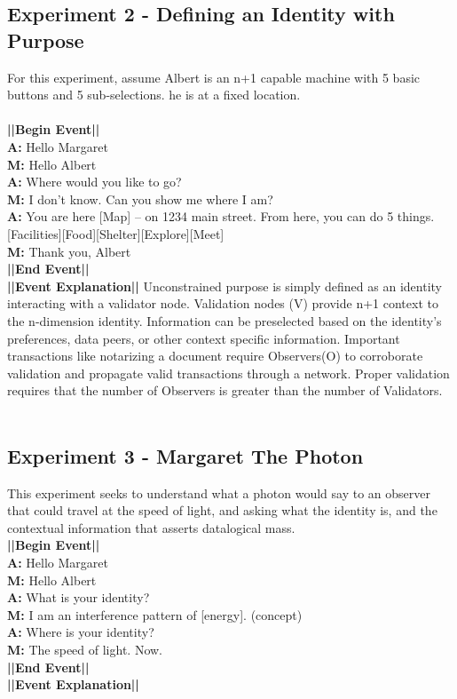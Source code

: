 \documentclass{article}
\begin{document}
\subsection{Experiment 2 - Defining an Identity with Purpose}
For this experiment, assume Albert is an n+1 capable machine with 5 basic buttons and 5 sub-selections.  he is at a fixed location. \\\\
\textbf{||Begin Event||} \\
\textbf{A:} Hello Margaret\\ 
\textbf{M:} Hello Albert \\
\textbf{A:} Where would you like to go? \\ 
\textbf{M:} I don’t know.  Can you show me where I am? \\ 
\textbf{A:} You are here [Map] – on 1234 main street.  From here, you can do 5 things. [Facilities][Food][Shelter][Explore][Meet] \\
\textbf{M:} Thank you, Albert \\
\textbf{||End Event||} \\
\textbf{||Event Explanation||} Unconstrained purpose is simply defined as an identity interacting with a validator node.  Validation nodes (V) provide n+1 context to the n-dimension identity.  Information can be preselected based on the identity’s preferences, data peers, or other context specific information.  Important transactions like notarizing a document require Observers(O) to corroborate validation and propagate valid transactions through a network.  Proper validation requires that the number of Observers is greater than the number of Validators. \\\\

\subsection{Experiment 3 - Margaret The Photon}
This experiment seeks to understand what a photon would say to an observer that could travel at the speed of light, and asking what the identity is, and the contextual information that asserts datalogical mass. \\
\textbf{||Begin Event||} \\
\textbf{A:} Hello Margaret \\
\textbf{M:} Hello Albert \\
\textbf{A:} What is your identity? \\
\textbf{M:} I am an interference pattern of [energy]. (concept) \\
\textbf{A:} Where is your identity? \\
\textbf{M:} The speed of light. Now. \\
\textbf{||End Event||} \\
\textbf{||Event Explanation||}\\
\end{document}
